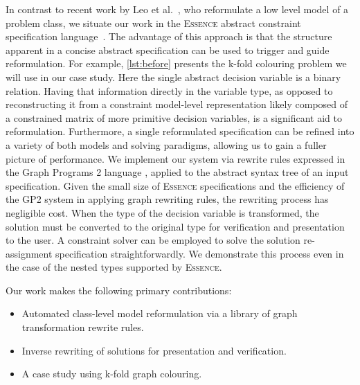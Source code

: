 \documentclass[a4paper,UKenglish,cleveref,pdfa]{lipics-v2021}
\newcommand{\essence}{\textsc{Essence}\xspace}
\begin{document}
In contrast to recent work by Leo et al.~\cite{Leo2024:automatic}, who reformulate a low level model of a problem class, we situate our work in the \essence abstract constraint specification language~\cite{frisch2008:essence}. The advantage of this approach is that the structure apparent in a concise abstract specification can be used to trigger and guide reformulation. For example, \cref{lst:before} presents the k-fold colouring problem we will use in our case study. Here the single abstract decision variable is a binary relation. Having that information directly in the variable type, as opposed to reconstructing it from a constraint model-level representation likely composed of a constrained matrix of more primitive decision variables, is a significant aid to reformulation. Furthermore, a single reformulated specification can be refined into a variety of both models and solving paradigms, allowing us to gain a fuller picture of performance. We implement our system via rewrite rules expressed in the Graph Programs 2 language \cite{campbell2020improved,plump2017imperative}, applied to the abstract syntax tree of an input specification. Given the small size of \essence specifications and the efficiency of the GP2 system in applying graph rewriting rules, the rewriting process has negligible cost. When the type of the decision variable is transformed, the solution must be converted to the original type for verification and presentation to the user. A constraint solver can be employed to solve the solution re-assignment specification straightforwardly. We demonstrate this process even in the case of the nested types supported by \essence.


Our work makes the following primary contributions:
\begin{itemize}
\item Automated class-level model reformulation via a library of graph transformation rewrite rules.
\item Inverse rewriting of solutions for presentation and verification.
\item A case study using k-fold graph colouring.
\end{itemize}
\end{document}
